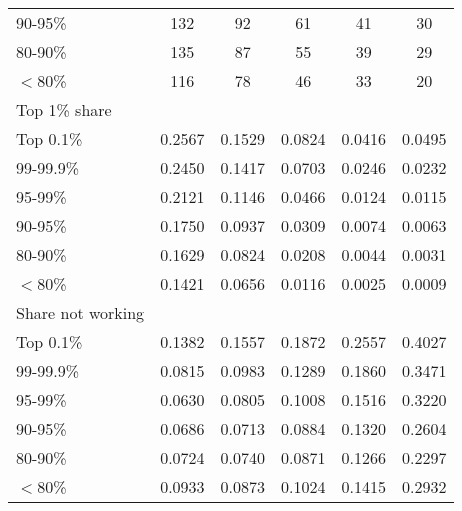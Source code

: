 \begin{tabular}{l*{5}{c}}
\hspace{3mm} 90-95\% &  132 &   92 &   61 &   41 &   30\\
\hspace{3mm} 80-90\% &  135 &   87 &   55 &   39 &   29\\
\hspace{3mm} $<$80\% &  116 &   78 &   46 &   33 &   20\\
Top 1\% share \\
\hspace{3mm} Top 0.1\% & 0.2567 & 0.1529 & 0.0824 & 0.0416 & 0.0495\\
\hspace{3mm} 99-99.9\% & 0.2450 & 0.1417 & 0.0703 & 0.0246 & 0.0232\\
\hspace{3mm} 95-99\% & 0.2121 & 0.1146 & 0.0466 & 0.0124 & 0.0115\\
\hspace{3mm} 90-95\% & 0.1750 & 0.0937 & 0.0309 & 0.0074 & 0.0063\\
\hspace{3mm} 80-90\% & 0.1629 & 0.0824 & 0.0208 & 0.0044 & 0.0031\\
\hspace{3mm} $<$80\% & 0.1421 & 0.0656 & 0.0116 & 0.0025 & 0.0009\\
Share not working \\
\hspace{3mm} Top 0.1\% & 0.1382 & 0.1557 & 0.1872 & 0.2557 & 0.4027\\
\hspace{3mm} 99-99.9\% & 0.0815 & 0.0983 & 0.1289 & 0.1860 & 0.3471\\
\hspace{3mm} 95-99\% & 0.0630 & 0.0805 & 0.1008 & 0.1516 & 0.3220\\
\hspace{3mm} 90-95\% & 0.0686 & 0.0713 & 0.0884 & 0.1320 & 0.2604\\
\hspace{3mm} 80-90\% & 0.0724 & 0.0740 & 0.0871 & 0.1266 & 0.2297\\
\hspace{3mm} $<$80\% & 0.0933 & 0.0873 & 0.1024 & 0.1415 & 0.2932\\
\bottomrule
\end{tabular}
